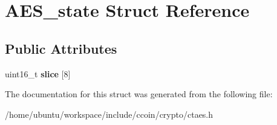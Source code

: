 \hypertarget{structAES__state}{\section{A\-E\-S\-\_\-state Struct Reference}
\label{structAES__state}
}
\subsection*{Public Attributes}
\begin{DoxyCompactItemize}
\item 
\hypertarget{structAES__state_a7cb81fabbdc20b8f9bb7a614981f03c8}{uint16\-\_\-t {\bfseries slice} \mbox{[}8\mbox{]}}\label{structAES__state_a7cb81fabbdc20b8f9bb7a614981f03c8}

\end{DoxyCompactItemize}


The documentation for this struct was generated from the following file\-:\begin{DoxyCompactItemize}
\item 
/home/ubuntu/workspace/include/ccoin/crypto/ctaes.\-h\end{DoxyCompactItemize}
